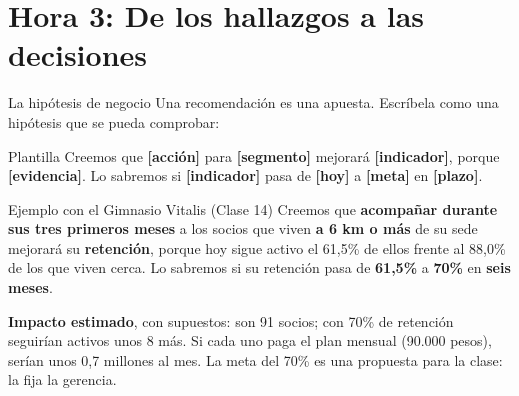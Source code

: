 \documentclass[aspectratio=169,11pt]{beamer}
\begin{document}
\section{Hora 3: De los hallazgos a las decisiones}
\begin{frame}[t]{La hipótesis de negocio}
  \small Una recomendación es una apuesta. Escríbela como una hipótesis que
  se pueda comprobar:
  \vspace{0.1cm}
  \begin{block}{Plantilla}
    \footnotesize Creemos que \textbf{[acción]} para \textbf{[segmento]}
    mejorará \textbf{[indicador]}, porque \textbf{[evidencia]}. Lo sabremos
    si \textbf{[indicador]} pasa de \textbf{[hoy]} a \textbf{[meta]} en
    \textbf{[plazo]}.
  \end{block}
  \begin{exampleblock}{Ejemplo con el Gimnasio Vitalis (Clase 14)}
    \footnotesize Creemos que \textbf{acompañar durante sus tres primeros
    meses} a los socios que viven \textbf{a 6 km o más} de su sede mejorará
    su \textbf{retención}, porque hoy sigue activo el 61,5\% de ellos frente
    al 88,0\% de los que viven cerca. Lo sabremos si su retención pasa de
    \textbf{61,5\%} a \textbf{70\%} en \textbf{seis meses}.
  \end{exampleblock}
  \footnotesize\textbf{Impacto estimado}, con supuestos: son 91 socios; con
  70\% de retención seguirían activos unos 8 más. Si cada uno paga el plan
  mensual (90.000 pesos), serían unos 0,7 millones al mes. La meta del 70\%
  es una propuesta para la clase: la fija la gerencia.
\end{frame}
\end{document}
